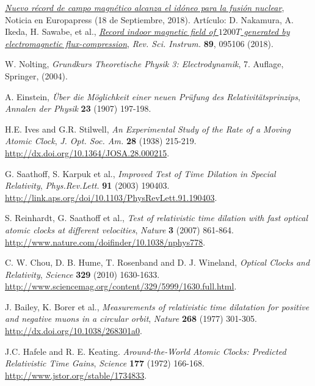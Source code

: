 \begin{thebibliography}{99}

\href{https://www.europapress.es/ciencia/laboratorio/noticia-nuevo-record-campo-magnetico-alcanza-idoneo-fusion-nuclear-20180918110647.html}{\textit{Nuevo récord de campo magnético alcanza el idóneo para la fusión nuclear}}, Noticia en Europapress (18 de Septiembre, 2018). Artículo: D. Nakamura, A. Ikeda, H. Sawabe, et al., \href{https://doi.org/10.1063/1.5044557}{\textit{Record indoor magnetic field of $1200 T$ generated by electromagnetic flux-compression}}, \textsl{Rev. Sci. Instrum.} \textbf{89}, 095106 (2018).



 W. Nolting, {\it Grundkurs Theoretische Physik 3: Electrodynamik}, 7. Auflage, Springer, (2004).

 A. Einstein, {\it \"Uber die Möglichkeit einer neuen Pr\"ufung des Relativitätsprinzips}, {\sl Annalen der Physik} {\bf 23} (1907) 197-198.

 H.E. Ives and G.R. Stilwell, {\it An Experimental Study of the Rate of a Moving Atomic Clock}, {\sl J. Opt. Soc. Am.} {\bf 28} (1938) 215-219. \url{http://dx.doi.org/10.1364/JOSA.28.000215}.

 G. Saathoff, S. Karpuk et al., {\it Improved Test of Time Dilation in Special Relativity}, {\sl Phys.Rev.Lett.} {\bf 91} (2003) 190403. \url{http://link.aps.org/doi/10.1103/PhysRevLett.91.190403}.

 S. Reinhardt, G. Saathoff et al., {\it Test of relativistic time dilation with fast optical atomic clocks at different velocities}, {\sl Nature} {\bf 3} (2007) 861-864. \url{http://www.nature.com/doifinder/10.1038/nphys778}.

 C. W. Chou, D. B. Hume, T. Rosenband and D. J. Wineland, {\em Optical Clocks and Relativity}, {\sl Science} {\bf 329} (2010) 1630-1633. \url{http://www.sciencemag.org/content/329/5999/1630.full.html}.

 J. Bailey, K. Borer et al., {\it Measurements of relativistic time dilatation for positive and negative muons in a circular orbit}, {\sl Nature} {\bf 268} (1977) 301-305. \url{http://dx.doi.org/10.1038/268301a0}.

 J.C. Hafele and R. E. Keating. {\it Around-the-World Atomic Clocks: Predicted Relativistic Time Gains}, {\sl Science} {\bf 177} (1972) 166-168. \url{http://www.jstor.org/stable/1734833}.


\end{thebibliography}
